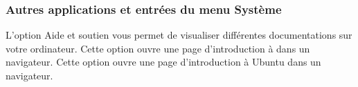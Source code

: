 \subsubsection{Autres applications et entrées du menu Système}
L'option Aide et soutien vous permet de visualiser différentes documentations sur votre ordinateur.
Cette option ouvre une page d'introduction à  dans un navigateur.
Cette option ouvre une page d'introduction à Ubuntu dans un navigateur.
